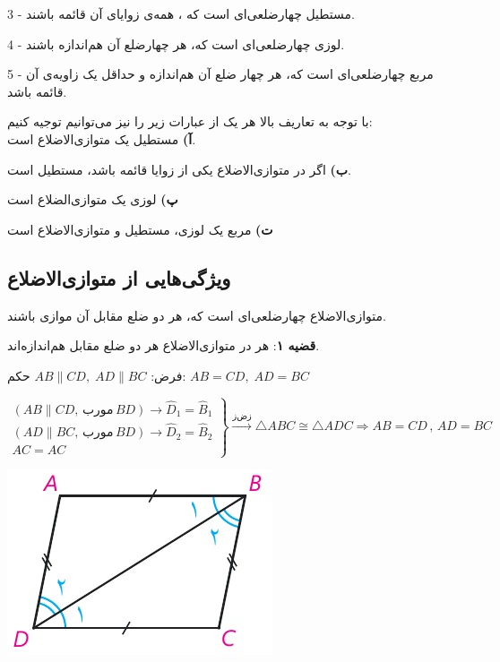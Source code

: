 \documentclass[12pt, a4paper]{book}
\begin{document}
	3 -
	مستطیل چهارضلعی‌ای است که ، همه‌ی زوایای آن قائمه باشند.
	
	4 -
	لوزی چهارضلعی‌ای است که، هر چهارضلع آن هم‌اندازه باشند.
	
	5 -
	مربع چهارضلعی‌ای است که، هر چهار ضلع آن هم‌اندازه و حداقل یک زاویه‌ی آن قائمه باشد.
	\newline

با توجه به تعاریف بالا هر یک از عبارات زیر را نیز می‌توانیم توجیه کنیم: \smallskip\\

\textbf{آ)} مستطیل یک متوازی‌الاضلاع است.

\textbf{ب)} اگر در متوازی‌الاضلاع یکی از زوایا قائمه باشد، مستطیل است.

\textbf{پ)} لوزی یک متوازی‌الضلاع است

\textbf{ت)} مربع یک لوزی، مستطیل و متوازی‌الاضلاع است

\subsection{ویژگی‌هایی از متوازی‌الاضلاع}
متوازی‌الاضلاع چهارضلعی‌ای است که، هر دو ضلع مقابل آن موازی باشند.
\newline

\textbf{قضیه ۱}: هر در متوازی‌الاضلاع هر دو ضلع مقابل هم‌اندازه‌اند.

\begin{minipage}{.7\textwidth}
		\centering فرض: 
		$AB \parallel CD, \; AD \parallel BC$
		\qquad حکم:
		$AB = CD, \; AD = BC$
	\begin{flushleft}
			$ \left. \begin{array}{rll}
		(AB \parallel CD, \, \text{مورب} \, BD ) \rightarrow \widehat{D}_1 = \widehat{B}_1 \\ (AD \parallel BC, \, \text{مورب} \, BD ) \rightarrow \widehat{D}_2 = \widehat{B}_2 \\ AC =AC
		\end{array} \right\} \xrightarrow{\text{زض‌ز}} \triangle ABC \cong  \triangle ADC 
		\Rightarrow AB = CD \, , \, AD = BC$
	\end{flushleft}
\end{minipage}
\begin{minipage}{.28\textwidth}
	\begin{flushleft}
		\includegraphics{"Shapes/Fasl - 3/Dars 1/qazie 1.pdf"}
	\end{flushleft}
\end{minipage}
\newline \bigskip \bigskip
\end{document}
